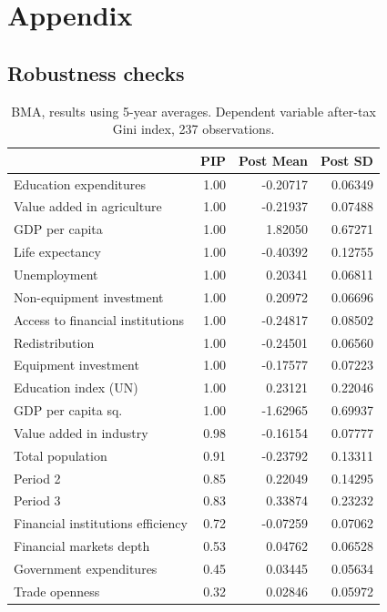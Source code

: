 \documentclass[preprint, nonatbib, 10pt]{elsarticle}
\begin{document}
\section{Appendix}
\label{appch2}



\subsection*{Robustness checks}
\begin{table}[ht!]
  \centering
  \small
  \caption{BMA, results using 5-year averages. Dependent variable after-tax Gini index, 237 observations.}\label{res:5y_gini}
  \begin{tabular}{lrrr}
    \toprule
   & PIP & Post Mean & Post SD \\
    \midrule
    Education expenditures & 1.00 & -0.20717 & 0.06349 \\
    Value added in agriculture & 1.00 & -0.21937 & 0.07488 \\ 
    GDP per capita & 1.00 & 1.82050 & 0.67271 \\ 
    Life expectancy & 1.00 & -0.40392 & 0.12755 \\ 
    Unemployment & 1.00 & 0.20341 & 0.06811 \\
    Non-equipment investment & 1.00 & 0.20972 & 0.06696 \\ 
    Access to financial institutions & 1.00 & -0.24817 & 0.08502 \\ 
    Redistribution & 1.00 & -0.24501 & 0.06560 \\ 
    Equipment investment & 1.00 & -0.17577 & 0.07223 \\ 
    Education index (UN) & 1.00 & 0.23121 & 0.22046 \\ 
    GDP per capita sq. & 1.00 & -1.62965 & 0.69937 \\
    Value added in industry & 0.98 & -0.16154 & 0.07777 \\ 
    Total population & 0.91 & -0.23792 & 0.13311 \\ 
    Period 2 & 0.85 & 0.22049 & 0.14295 \\ 
    Period 3 & 0.83 & 0.33874 & 0.23232 \\
    Financial institutions efficiency & 0.72 & -0.07259 & 0.07062 \\ 
    Financial markets depth & 0.53 & 0.04762 & 0.06528 \\
    Government expenditures & 0.45 & 0.03445 & 0.05634 \\ 
    Trade openness & 0.32 & 0.02846 & 0.05972 \\

\end{tabular}
\end{table}
\end{document}
